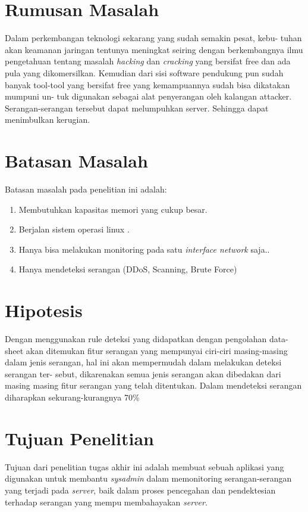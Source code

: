 \section{Rumusan Masalah}
Dalam perkembangan teknologi sekarang yang sudah semakin pesat, kebu-
tuhan akan keamanan jaringan tentunya meningkat seiring dengan berkembangnya
ilmu pengetahuan tentang masalah \emph{hacking} dan \emph{cracking} yang bersifat free dan ada
pula yang dikomersilkan. Kemudian dari sisi software pendukung pun sudah banyak
tool-tool yang bersifat free yang kemampuannya sudah bisa dikatakan mumpuni un-
tuk digunakan sebagai alat penyerangan oleh kalangan attacker. Serangan-serangan
tersebut dapat melumpuhkan server. Sehingga dapat menimbulkan kerugian.


\section{Batasan Masalah}
Batasan masalah pada penelitian ini adalah:
\begin{enumerate}
\item Membutuhkan kapasitas memori yang cukup besar.
\item Berjalan sistem operasi linux .
\item Hanya bisa melakukan monitoring pada satu \emph{interface network} saja..
\item Hanya mendeteksi serangan (DDoS, Scanning, Brute Force)
\end{enumerate}

\section{Hipotesis}
Dengan menggunakan rule deteksi yang didapatkan dengan pengolahan data-
sheet akan ditemukan fitur serangan yang mempunyai ciri-ciri masing-masing dalam
jenis serangan, hal ini akan mempermudah dalam melakukan deteksi serangan ter-
sebut, dikarenakan semua jenis serangan akan dibedakan dari masing masing fitur
serangan yang telah ditentukan. Dalam mendeteksi serangan diharapkan sekurang-kurangnya 70\% 


\section{Tujuan Penelitian}
Tujuan dari penelitian tugas akhir ini adalah membuat sebuah aplikasi yang digunakan untuk membantu \emph{sysadmin} dalam memonitoring serangan-serangan yang terjadi pada \emph{server}, baik dalam proses pencegahan dan pendektesian terhadap serangan yang mempu membahayakan \emph{server}.




